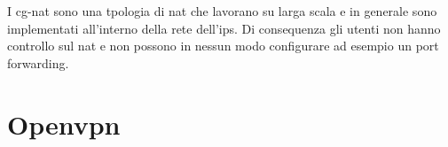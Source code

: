 I cg-nat sono una tpologia di nat che lavorano su larga scala e in generale sono implementati all'interno della rete dell'ips.
Di consequenza gli utenti non hanno controllo sul nat e non possono in nessun modo configurare ad esempio un port forwarding.


\section{Openvpn}

